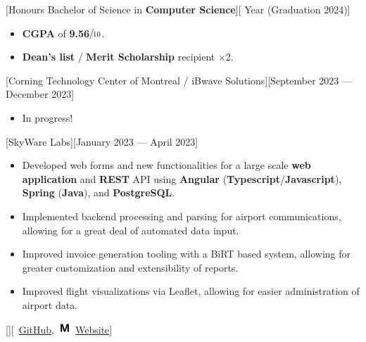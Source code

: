 \documentclass{article}
\begin{document}
[Honours Bachelor of Science in
	\textbf{Computer Science}][ Year (Graduation 2024)]

\begin{itemize}
	\item \textbf{CGPA} of \textbf{9.56}\(\sfrac{}{10}\).
	\item \textbf{Dean's list} / \textbf{Merit Scholarship} recipient
	      \(\times\)2.
\end{itemize}

\vspace*{\fill}


[Corning Technology Center of Montreal / iBwave Solutions][September 2023 --- December 2023]

\begin{itemize}
	\item In progress!
\end{itemize}

[SkyWare Labs][January 2023 --- April 2023]

\begin{itemize}
	\item Developed web forms and new functionalities for a large scale
	      \textbf{web application} and \textbf{REST} API using
	      \textbf{Angular} (\textbf{Typescript}/\textbf{Javascript}),
	      \textbf{Spring} (\textbf{Java}), and \textbf{PostgreSQL}.
	\item Implemented backend processing and parsing for airport communications,
	      allowing for a great deal of automated data input.
	\item Improved invoice generation tooling with a BiRT based system, allowing
	      for greater customization and extensibility of reports.
	\item Improved flight visualizations via Leaflet, allowing for easier
	      administration of airport data.
\end{itemize}

\vspace*{\fill}


[][\faGithub\
	\href{https://github.com/kinseyda/muziko}{GitHub},\
	\includegraphics[height=1.5ex]{muziko-icon-small.png}\
	\href{https://kinseyda.github.io/muziko/}{Website}]
\end{document}
